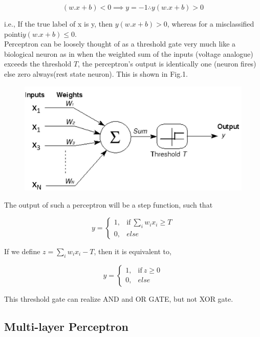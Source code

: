 \documentclass[12pt]{article}
\begin{document}
$$(w.x + b) < 0  \implies y = -1 \therefore y(w.x + b) > 0 $$

i.e., If the true label of x is y, then $y(w.x + b) > 0 $, whereas for a misclassified pointi$y(w.x + b) \leq 0 $.\\







Perceptron can be loosely thought of as a threshold gate very much like a biological neuron as in when the weighted sum of the inputs (voltage analogue) exceeds the threshold $T$, the perceptron's output is identically one (neuron fires) else zero always(rest state neuron). This is shown in Fig.1.

\begin{figure}[h]
	\centering
	\includegraphics[width=0.5\linewidth]{img/perceptron}
	\caption{}
	\label{fig:perceptron}
\end{figure}

\cleardoublepage

The output of such a perceptron will be a step function, such that 



\begin{equation} 
y =
\begin{cases}
1, & \text{if} \  \sum_{i} w_ix_i \geq T 
\\
0 , &   else 
\end{cases}
\end{equation}


If we define $z = \sum_{i} w_ix_i - T $, then it is equivalent to,

\begin{equation} 
y =
\begin{cases}
1, & \text{if} \ z \geq 0 
\\
0 , &   else 
\end{cases}
\end{equation}


This threshold gate can realize AND and OR GATE, but not XOR gate.

\subsection{Multi-layer Perceptron}
\end{document}
